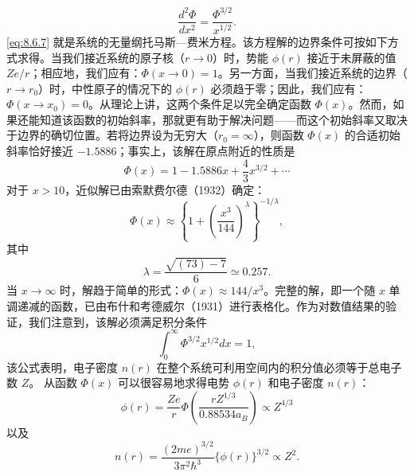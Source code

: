 \begin{equation}\tag{8.6.7}\label{eq:8.6.7}
{ \frac { d ^{2} \Phi } { d x ^{2} } } = { \frac { \Phi ^{3 / 2} } { x ^{1 / 2} } } .
\end{equation}
\autoref{eq:8.6.7} 就是系统的无量纲托马斯---费米方程。该方程解的边界条件可按如下方式求得。当我们接近系统的原子核（\(r \to 0\)）时，势能 \(\phi(r)\) 接近于未屏蔽的值 \(Ze/r\)；相应地，我们应有：\(\Phi(x \to 0) = 1\)。另一方面，当我们接近系统的边界（\(r \to r_0\)）时，中性原子的情况下的 \(\phi(r)\) 必须趋于零；因此，我们应有：\(\Phi(x \to x_0) = 0\)。从理论上讲，这两个条件足以完全确定函数 \(\Phi(x)\)。然而，如果还能知道该函数的初始斜率，那就更有助于解决问题——而这个初始斜率又取决于边界的确切位置。若将边界设为无穷大（\(r_0 = \infty\)），则函数 \(\Phi(x)\) 的合适初始斜率恰好接近 \(-1.5886\)；事实上，该解在原点附近的性质是
\begin{equation}\tag{8.6.8}\label{eq:8.6.8}
\Phi ( x ) = 1 - 1 . 58 86 x + \frac { 4 } { 3 } x ^{3 / 2} + \cdots
\end{equation}
对于 \(x > 10\)，近似解已由索默费尔德（1932）确定：
\begin{equation}\tag{8.6.9}\label{eq:8.6.9}
\Phi ( x ) \approx \left\{ 1 + \left( \frac { x ^{3} } { 14 4 } \right) ^{\lambda} \right\} ^{- 1 / \lambda} ,
\end{equation}
其中
\begin{equation}\tag{8.6.10}\label{eq:8.6.10}
\lambda = \frac { \sqrt { ( 73 ) - 7 } } { 6 } \simeq 0 . 25 7 .
\end{equation}
当 \(x \rightarrow \infty\) 时，解趋于简单的形式：\(\Phi(x) \approx 144/x^{3}\)。完整的解，即一个随 \(x\) 单调递减的函数，已由布什和考德威尔（1931）进行表格化。作为对数值结果的验证，我们注意到，该解必须满足积分条件
\begin{equation}\tag{8.6.11}\label{eq:8.6.11}
\int _ { 0 } ^{\infty} \Phi ^{3 / 2} x ^{1 / 2} d x = 1 ,
\end{equation}
该公式表明，电子密度 \(n(r)\) 在整个系统可利用空间内的积分值必须等于总电子数 \(Z\)。
从函数 \(\Phi(x)\) 可以很容易地求得电势 \(\phi(r)\) 和电子密度 \(n(r)\)：
\begin{equation}\tag{8.6.12}\label{eq:8.6.12}
\phi ( r ) = \frac { Z e } { r } \Phi \left( \frac { r Z ^{1 / 3} } { 0 . 88 53 4 a _ { B } } \right) \propto Z ^{4 / 3}
\end{equation}
以及
\begin{equation}\tag{8.6.13}\label{eq:8.6.13}
n ( r ) = \frac { ( 2 m e ) ^{3 / 2} } { 3 \pi ^{2} \hbar ^{3} } \{ \phi ( r ) \} ^{3 / 2} \propto Z ^{2} .
\end{equation}
